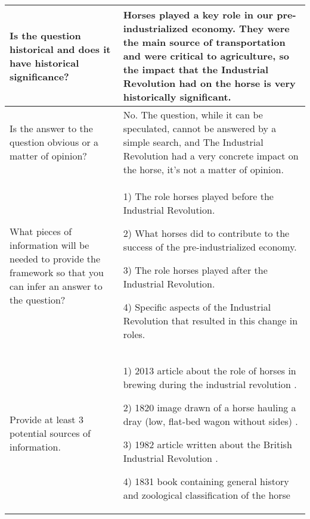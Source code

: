 {\renewcommand{\arraystretch}{2}
\begin{longtable}{ | p{6cm} | p{10cm} | }

\hline
Is the question historical and does it have historical significance? & 

Horses played a key role in our pre-industrialized economy.  They were the main source of transportation and were critical to agriculture, so the impact that the Industrial Revolution had on the horse is very historically significant.
\\\hline

Is the answer to the question obvious or a matter of opinion? & 

No.  The question, while it can be speculated, cannot be answered by a simple search, and The Industrial Revolution had a very concrete impact on the horse, it's not a matter of opinion.
\\\hline

What pieces of information will be needed to provide the framework so that you can infer an answer to the question? & 

1) The role horses played before the Industrial Revolution. \n\n

2) What horses did to contribute to the success of the pre-industrialized economy. \n\n

3) The role horses played after the Industrial Revolution. \n\n

4) Specific aspects of the Industrial Revolution that resulted in this change in roles. \newline
\\\hline

Provide at least 3 potential sources of information. & 

1) 2013 article about the role of horses in brewing during the industrial revolution \cite{almer13}. \n\n

2) 1820 image drawn of a horse hauling a dray (low, flat-bed wagon without sides) \cite{schar20}. \n\n

3) 1982 article written about the British Industrial Revolution \cite{musso82}. \n\n

4) 1831 book containing general history and zoological classification of the horse 
\cite{youat31} \newline
\\\hline

\end{longtable}}
